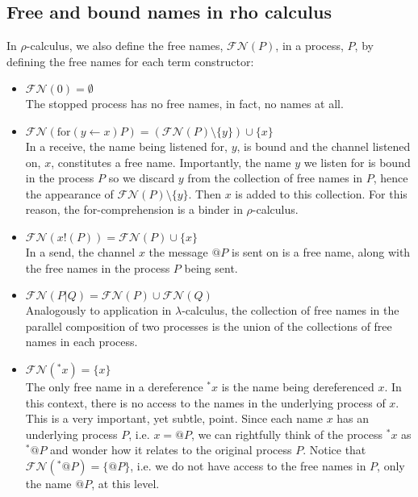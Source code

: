 \documentclass[12pt]{article}
\numberwithin{equation}{section}
\begin{document}
\subsection{Free and bound names in rho calculus}
In $\rho$-calculus, we also define the free names, $\mathcal{FN}(P)$, in a process, $P$, by defining the free names for each term constructor:
\begin{itemize}
\item $\mathcal{FN}(0) = \emptyset$\\
The stopped process has no free names, in fact, no names at all.

\item $\mathcal{FN}( \text{for}(y \leftarrow x)P) = (\mathcal{FN}(P) \setminus \{ y \}) \cup \{ x \}$ \\
In a receive, the name being listened for, $y$, is bound and the channel listened on, $x$, constitutes a free name. Importantly, the name $y$ we listen for is bound in the process $P$ so we discard $y$ from the collection of free names in $P$, hence the appearance of $\mathcal{FN}(P) \setminus \{ y \}$. Then $x$ is added to this collection. For this reason, the for-comprehension is a binder in $\rho$-calculus.

\item $\mathcal{FN}(x!(P)) = \mathcal{FN}(P) \cup \{ x \}$ \\
In a send, the channel $x$ the message $@P$ is sent on is a free name, along with the free names in the process $P$ being sent.

\item $\mathcal{FN}(P|Q) = \mathcal{FN}(P) \cup \mathcal{FN}(Q)$ \\
Analogously to application in $\lambda$-calculus, the collection of free names in the parallel composition of two processes is the union of the collections of free names in each process.

\item $\mathcal{FN}({}^*x) = \{ x \}$ \\
The only free name in a dereference ${}^*x$ is the name being dereferenced $x$. In this context, there is no access to the names in the underlying process of $x$. This is a very important, yet subtle, point. Since each name $x$ has an underlying process $P$, i.e. $x=@P$, we can rightfully think of the process ${}^*x$ as ${}^*@P$ and wonder how it relates to the original process $P$. Notice that $\mathcal{FN}({}^*@P) = \{ @P \}$, i.e. we do not have access to the free names in $P$, only the name $@P$, at this level.
\end{itemize}
\end{document}
